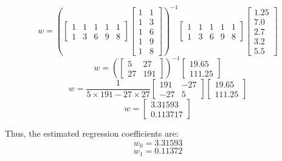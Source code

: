 \documentclass[12pt]{article}
\begin{document}
\begin{enumerate}[leftmargin=\labelsep, label=\textbf{\arabic*.)}]
\begin{itemize}
\begin{minipage}{1\textwidth}
                        \[
                            w = (\begin{bmatrix} 1 & 1 & 1 & 1 & 1 \\ 1 & 3 & 6 & 9 & 8 \end{bmatrix} \begin{bmatrix} 1 & 1 \\ 1 & 3 \\ 1 & 6 \\ 1 & 9 \\ 1 & 8 \end{bmatrix})^{-1} \begin{bmatrix} 1 & 1 & 1 & 1 & 1 \\ 1 & 3 & 6 & 9 & 8 \end{bmatrix} \begin{bmatrix} 1.25 \\ 7.0 \\ 2.7 \\ 3.2 \\ 5.5 \end{bmatrix}
                        \]
                        \[
                            w = (\begin{bmatrix} 5 & 27 \\ 27 & 191 \end{bmatrix})^{-1} \begin{bmatrix} 19.65 \\ 111.25 \end{bmatrix}
                        \]
                        \[
                            w = \frac{1}{5 \times 191 - 27 \times 27} \begin{bmatrix} 191 & -27 \\ -27 & 5 \end{bmatrix} \begin{bmatrix} 19.65 \\ 111.25 \end{bmatrix}
                        \]
                        \[
                            w = \begin{bmatrix} 3.31593 \\ 0.113717 \end{bmatrix}
                        \]

                        Thus, the estimated regression coefficients are:
                        \[
                            w_{\text{0}} = 3.31593
                        \]
                        \[
                            w_{\text{1}} = 0.11372
                        \]


\end{minipage}
\end{itemize}
\end{enumerate}
\end{document}
